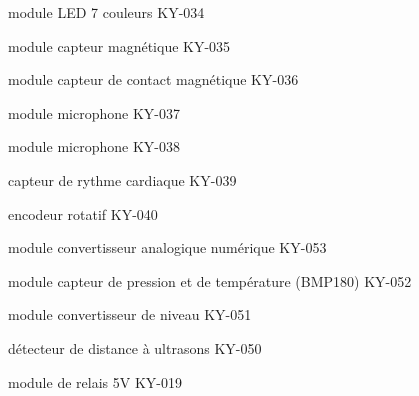 \begin{liste}
    \item module LED 7 couleurs KY-034 
    \item module capteur magnétique KY-035 
    \item module capteur de contact magnétique KY-036 
    \item module microphone KY-037
    \item module microphone KY-038 
    \item capteur de rythme cardiaque KY-039 
    \item encodeur rotatif KY-040 
    \item module convertisseur analogique numérique KY-053
    \item module capteur de pression et de température (BMP180) KY-052
    \item module convertisseur de niveau KY-051
    \item détecteur de distance à ultrasons KY-050 
    \item module de relais 5V KY-019  
\end{liste}

